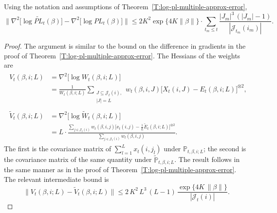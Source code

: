 \documentclass[final]{statsoc}
\newcommand{\qedhere}{}
\begin{document}
\begin{lemma}\label{L:hessian-approx-bound}
Using the notation and assumptions of
Theorem~\ref{T:log-pl-multiple-approx-error},
\begin{equation*}
    \Big\|
        \nabla^2\big[ \log \widetilde{\mathit{PL}}_t(\beta) \big]
        -
        \nabla^2\big[ \log \mathit{PL}_t(\beta) \big]
    \Big\|
        \leq
            2K^2
            \exp\{4 K \| \beta \|\}
            \cdot
            \sum_{t_m \leq t}
                \frac{|J_m|^3 \, (|J_m| - 1)}{|\mathcal{J}_{t_m}(i_m)|}.
\end{equation*}
\end{lemma}
\begin{proof}
The argument is similar to the bound on the difference in gradients in
the proof of Theorem~\ref{T:log-pl-multiple-approx-error}.  The Hessians of
the weights are
\begin{align*}
    \begin{split}
    V_t(\beta,i;L)
        &=
        \nabla^2 \big[  \log W_t(\beta, i; L) \big] \\
        &=
        \frac{1}{W_t(\beta,i;L)}
        \sum_{\substack{J \subseteq \mathcal{J}_t(i), \\
                        |J| = L}}
            w_t(\beta,i,J)
            \Big[
                X_t(i,J)
                -
                E_t(\beta,i;L)
            \Big]^{\otimes 2},
    \end{split} \\
    \begin{split}
    \widetilde V_t(\beta,i;L)
        &=
        \nabla^2 \big[ \log \widetilde W_t(\beta,i;L) \big] \\
        &=
        L
        \cdot
        \frac{
            \sum_{j \in \mathcal{J}_t(i)}
                w_t(\beta, i, j)
                \Big[ x_t(i,j) - \tfrac{1}{L} \widetilde E_t(\beta,i;L) \Big]^{\otimes 2}
        }{
            \sum_{j \in \mathcal{J}_t(i)}
                w_t(\beta, i, j)
        }.
    \end{split}
\end{align*}
The first is the covariance matrix of $\sum_{l=1}^L x_t(i,j_l)$ under
$\mathbb{P}_{t,\beta,i;L}$; the second is the covariance matrix of the same
quantity under $\tilde{\mathbb{P}}_{t,\beta,i;L}$.
The result follows in the same manner as in the proof of
Theorem~\ref{T:log-pl-multiple-approx-error}.
The relevant intermediate bound is
\[
    \Big\| V_{t}(\beta, i; L) - \widetilde{V}_t(\beta, i; L) \Big\|
        \leq
        2\, K^2 \, L^3 \, (L - 1)
        \,
        \frac{\exp\{4 K \, \| \beta \|\}}{| \mathcal{J}_t(i) |}.
    \qedhere
\]
\end{proof}
\end{document}
